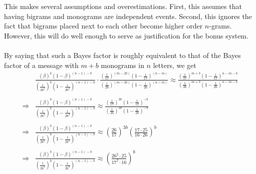 This makes several assumptions and overestimations. First, this
assumes that having bigrams and monograms are independent events.
Second, this ignores the fact that bigrams placed next to each
other become higher order $n$-grams. However, this will do well
enough to serve as justification for the bonus system.
\\\\By saying that such a Bayes factor is roughly equivalent to
that of the Bayes factor of a message with $m+b$ monograms in $n$
letters, we get
\begin{align*}
	            &
	\frac{(\beta)^b(1-\beta)^{(n-1)-b}}{(\frac{1}{26^2})^b(1-\frac{1}{26^2})^{(n-1)-b}}\cdot\frac{(\frac{1}{17})^{(m-2b)}(1-\frac{1}{17})^{(n-m)}}{(\frac{1}{26})^{(m-2b)}(1-\frac{1}{26})^{(n-m)}}
	\approx
	\frac{(\frac{1}{17})^{m+b}(1-\frac{1}{17})^{n-m-b}}{(\frac{1}{26})^{m+b}(1-\frac{1}{26})^{n-m-b}}
	\\\\
	\Rightarrow &
	\frac{(\beta)^b(1-\beta)^{(n-1)-b}}{(\frac{1}{26^2})^b(1-\frac{1}{26^2})^{(n-1)-b}}\approx
	\frac{(\frac{1}{17})^{3b}(1-\frac{1}{17})^{-b}}{(\frac{1}{26})^{3b}(1-\frac{1}{26})^{-b}}
	\\\\
	\Rightarrow &
	\frac{(\beta)^b(1-\beta)^{(n-1)-b}}{(\frac{1}{26^2})^b(1-\frac{1}{26^2})^{(n-1)-b}}\approx
	(\frac{26}{17})^{3b}(\frac{17\cdot25}{16\cdot26})^b
	\\\\
	\Rightarrow &
	\frac{(\beta)^b(1-\beta)^{(n-1)-b}}{(\frac{1}{26^2})^b(1-\frac{1}{26^2})^{(n-1)-b}}\approx
	(\frac{26^2\cdot25}{17^2\cdot16})^b
\end{align*}


